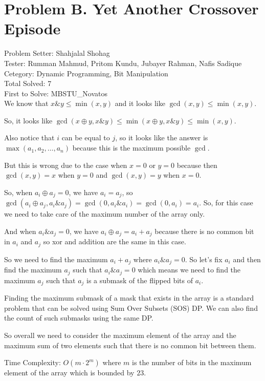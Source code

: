 \section*{Problem B. Yet Another Crossover Episode}

Problem Setter: Shahjalal Shohag \\
Tester: Rumman Mahmud, Pritom Kundu, Jubayer Rahman, Nafis Sadique \\
Cetegory: Dynamic Programming, Bit Manipulation \\
Total Solved: 7 \\
First to Solve: MBSTU\_Novatos \\

We know that $x \& y \le \min(x, y)$ and it looks like $\gcd(x, y) \le \min(x, y)$.

So, it looks like $\gcd(x \oplus y, x \& y) \le \min(x \oplus y, x \& y) \le \min(x, y)$.

Also notice that $i$ can be equal to $j$, so it looks like the answer is $\max({a_1, a_2, \ldots, a_n})$ because this is the maximum possible $\gcd$.

But this is wrong due to the case when $x = 0$ or $y = 0$ because then $\gcd(x, y) = x$ when $y = 0$ and $\gcd(x, y) = y$ when $x = 0$.

So, when $a_i \oplus a_j = 0$, we have $a_i = a_j$, so $\gcd(a_i \oplus a_j, a_i \& a_j) = \gcd(0, a_i \& a_i) = \gcd(0, a_i) = a_i$.
So, for this case we need to take care of the maximum number of the array only.

And when $a_i \& a_j = 0$, we have $a_i \oplus a_j = a_i + a_j$ because there is no common bit in $a_i$ and $a_j$
so xor and addition are the same in this case.

So we need to find the maximum $a_i + a_j$ where $a_i \& a_j = 0$. So let's fix $a_i$
and then find the maximum $a_j$ such that $a_i \& a_j = 0$ which means we 
need to find the maximum $a_j$ such that $a_j$ is a submask of the flipped bits of $a_i$.

Finding the maximum submask of a mask that exists in the array is a standard problem that can be solved
using Sum Over Subsets (SOS) DP. We can also find the count of such submasks using the same DP.

So overall we need to consider the maximum element of the array and the maximum sum of two elements such that there is no common bit between them.

Time Complexity: $O(m \cdot 2^m)$ where $m$ is the number of bits in the maximum element of the array which is bounded by $23$.
